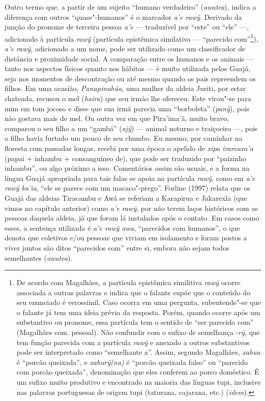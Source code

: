 Outro termo que, a partir de um sujeito ``humano verdadeiro''
(\emph{awatea}), indica a diferença com outros ``quase"-humanos'' é o
marcador \emph{a'e rawỹ}. Derivado da junção do pronome de terceira
pessoa \emph{a'e} --- traduzível por ``este'' ou ``ele'' ---, adicionado à
partícula \emph{rawỹ} (partícula epistêmica similativa --- ``parecido
com''\footnote{De acordo com Magalhães, a partícula epistêmica similitiva
  \emph{rawỹ} ocorre associada a outras palavras e indica que o falante
  supõe que o conteúdo do seu enunciado é verossímil. Caso ocorra em uma
  pergunta, subentende"-se que o falante já tem uma ideia prévia da
  resposta. Porém, quando ocorre após um substantivo ou pronome, essa
  partícula tem o sentido de ``ser parecido com'' (Magalhães com.
  pessoal). Não confundir com o sufixo de semelhança -\emph{rỹ}, que tem
  função parecida com a partícula \emph{rawỹ} e anexado a outros
  substantivos pode ser interpretado como ``semelhante a''. Assim, segundo
  Magalhães, \emph{xahua} é ``porcão queixada'', e \emph{xahurỹ(na)} é
  ``porcão queixada falso'' ou ``parecido com porcão queixada'', denominação
  que eles conferem ao porco doméstico. É um sufixo muito produtivo e
  encontrado na maioria das línguas tupi, inclusive nas palavras
  portuguesas de origem tupi (taturana, cajarana, etc.) (\emph{idem}).}),
\emph{a'e rawỹ}, adicionado a um nome, pode ser utilizado como um
classificador de distância e proximidade social. A comparação entre os
humanos e os animais --- tanto nos aspectos físicos quanto nos hábitos --- é
muito utilizada pelos Guajá, seja nos momentos de descontração ou até
mesmo quando os pais repreendem os filhos. Em uma ocasião,
\emph{Panapinuhũa}, uma mulher da aldeia Juriti, por estar chateada,
recusou o mel (\emph{haira}) que seu irmão lhe ofereceu. Este virou"-se
para mim em tom jocoso e disse que sua irmã parecia uma ``borboleta''
(\emph{panỹ}), pois não gostava mais de mel. Ou outra vez em que
Pira'ima'ã, muito bravo, comparou o seu filho a um ``gambá'' (\emph{ajỹ})
--- animal noturno e traiçoeiro ---, pois o filho havia furtado um pouco de
seu chumbo. Eu mesmo, por caminhar na floresta com passadas longas,
recebi por uma época o apelido de \emph{xipa iramuxa'a} (papai + inhambu
+ consanguíneo de), que pode ser traduzido por ``paizinho inhambu'', ou
algo próximo a isso. Comentários assim são usuais, e a forma na língua
Guajá apropriada para tais falas se apoia na partícula \emph{rawỹ}, como
em \emph{a'e rawỹ ka'ia}, ``ele se parece com um macaco"-prego''. Forline
(1997) relata que os Guajá das aldeias Tiracambu e Awá se referiam a
Karapirua e Jakarexĩa (que vimos no capítulo anterior) como \emph{a'e
rawỹ}, por não terem laços históricos com as pessoas daquela aldeia, já
que foram lá instalados após o contato. Em casos como esses, a sentença
utilizada é \emph{a'e rawỹ awa}, ``parecidos com humanos'', o que denota
que coletivos e/ou pessoas que viviam em isolamento e foram postos a
viver juntos são ditos ``parecidos com'' entre si, embora não sejam todos
semelhantes (\emph{awatea}).


